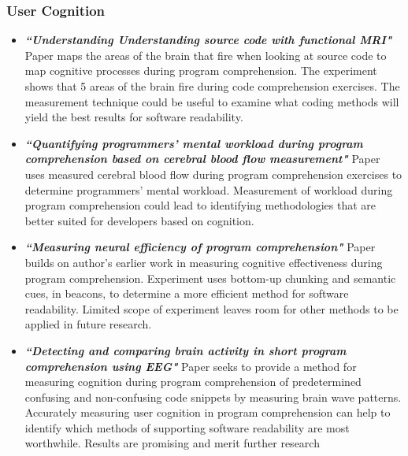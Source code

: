 \documentclass[a4paper, 10pt]{IEEEtran}
\begin{document}
\subsubsection{User Cognition}
\begin{itemize}
    \item \textbf{\textit{“Understanding Understanding source code with functional MRI"}}
    Paper maps the areas of the brain that fire when looking at source code to map cognitive processes during program comprehension. The experiment shows that 5 areas of the brain fire during code comprehension exercises. The measurement technique could be useful to examine what coding methods will yield the best results for software readability.
    \item \textbf{\textit{“Quantifying programmers' mental workload during program comprehension based on cerebral blood flow measurement"}}
    Paper uses measured cerebral blood flow during program comprehension exercises to determine programmers' mental workload. Measurement of workload during program comprehension could lead to identifying methodologies that are better suited for developers based on cognition. 
    \item \textbf{\textit{“Measuring neural efficiency of  program  comprehension"}}
    Paper builds on author's earlier work in measuring cognitive effectiveness during program comprehension. Experiment uses bottom-up chunking and semantic cues, in beacons, to determine a more efficient method for software readability. Limited scope of experiment leaves room for other methods to be applied in future research.
    \item \textbf{\textit{“Detecting and comparing brain activity in short program comprehension using EEG"}}
    Paper seeks to provide a method for measuring cognition during program comprehension of predetermined confusing and non-confusing code snippets by measuring brain wave patterns. Accurately measuring user cognition in program comprehension can help to identify which methods of supporting software readability are most worthwhile. Results are promising and merit further research

\end{itemize}
\end{document}
